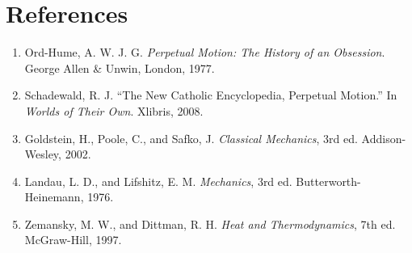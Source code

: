 \documentclass[11pt,twoside]{article}
\begin{document}
\section*{References}
\begin{enumerate}
\item Ord-Hume, A. W. J. G. \emph{Perpetual Motion: The History of an
Obsession}. George Allen \& Unwin, London, 1977.
\item Schadewald, R. J. ``The New Catholic Encyclopedia, Perpetual Motion.'' In
\emph{Worlds of Their Own}. Xlibris, 2008.
\item Goldstein, H., Poole, C., and Safko, J. \emph{Classical Mechanics}, 3rd
ed. Addison-Wesley, 2002.
\item Landau, L. D., and Lifshitz, E. M. \emph{Mechanics}, 3rd ed.
Butterworth-Heinemann, 1976.
\item Zemansky, M. W., and Dittman, R. H. \emph{Heat and Thermodynamics}, 7th
ed. McGraw-Hill, 1997.
\end{enumerate}
\end{document}
